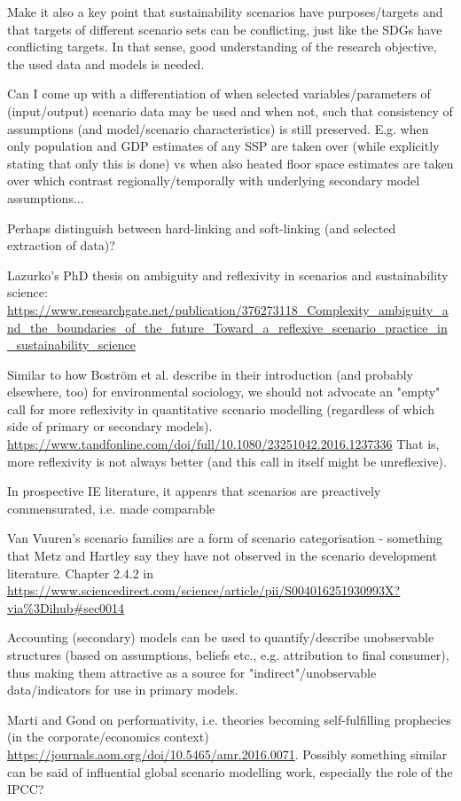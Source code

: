 \documentclass{article}
\begin{document}
Make it also a key point that sustainability scenarios have purposes/targets and that targets of different scenario sets can be conflicting, just like the SDGs have conflicting targets. In that sense, good understanding of the research objective, the used data and models is needed.

Can I come up with a differentiation of when selected variables/parameters of (input/output) scenario data may be used and when not, such that consistency of assumptions (and model/scenario characteristics) is still preserved. E.g. when only population and GDP estimates of any SSP are taken over (while explicitly stating that only this is done) vs when also heated floor space estimates are taken over which contrast regionally/temporally with underlying secondary model assumptions...

Perhaps distinguish between hard-linking and soft-linking (and selected extraction of data)?

Lazurko's PhD thesis on ambiguity and reflexivity in scenarios and sustainability science: \url{https://www.researchgate.net/publication/376273118_Complexity_ambiguity_and_the_boundaries_of_the_future_Toward_a_reflexive_scenario_practice_in_sustainability_science}

Similar to how Boström et al. describe in their introduction (and probably elsewhere, too) for environmental sociology, we should not advocate an "empty" call for more reflexivity in quantitative scenario modelling (regardless of which side of primary or secondary models). \url{https://www.tandfonline.com/doi/full/10.1080/23251042.2016.1237336} That is, more reflexivity is not always better (and this call in itself might be unreflexive).

In prospective IE literature, it appears that scenarios are preactively commensurated, i.e. made comparable 

Van Vuuren's scenario families are a form of scenario categorisation - something that Metz and Hartley say they have not observed in the scenario development literature. Chapter 2.4.2 in \url{https://www.sciencedirect.com/science/article/pii/S004016251930993X?via%3Dihub#sec0014}

Accounting (secondary) models can be used to quantify/describe unobservable structures (based on assumptions, beliefs etc., e.g. attribution to final consumer), thus making them attractive as a source for "indirect"/unobservable data/indicators for use in primary models.

Marti and Gond on performativity, i.e. theories becoming self-fulfilling prophecies (in the corporate/economics context) \url{https://journals.aom.org/doi/10.5465/amr.2016.0071}. Possibly something similar can be said of influential global scenario modelling work, especially the role of the IPCC?
\end{document}
